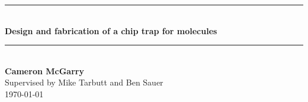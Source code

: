 \begin{titlepage}



\begin{minipage}{14cm}
  \begin{flushleft}
    \vspace*{4cm}
    \rule{\linewidth}{0.5mm} \\[0.4cm]
    {\huge \bfseries Design and fabrication of a chip trap for \CaF{} molecules}\\
    \rule{\linewidth}{0.5mm} \\[1.0cm]
    {\large \textbf{Cameron McGarry}} \\[1.0cm]
    {
    Supervised by Mike Tarbutt and Ben Sauer \\[5mm]
    \makeatletter
    \monthyeardate\today
    \makeatother
    \restoregeometry
    }
  \end{flushleft}
\end{minipage}

\end{titlepage}
